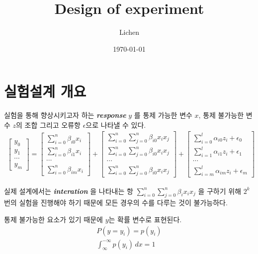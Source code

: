 \documentclass{article}
\author{Lichen}
\date{\today}
\title{Design of experiment}
\newcommand{\imp}[1]{\textbf{\textit{#1}}}
\begin{document}
\begin{titlepage}
    \maketitle
\end{titlepage}
    \section{실험설계 개요}
    실험을 통해 향상시키고자 하는 \imp{response} $y$ 를 통제 가능한 변수 $x$, 통제 불가능한 변수 $z$의 조합 그리고 오류항 $\epsilon$으로 나타낼 수 있다.
    \begin{align}
        \begin{bmatrix}
            y_0 \\ y_1 \\ \cdots \\ y_m
        \end{bmatrix} =
        \begin{bmatrix}
             \sum^n_{i=0}\beta_{i0} x_i\\
             \sum^n_{i=0}\beta_{i1} x_i\\
             \cdots\\
             \sum^n_{i=0}\beta_{im} x_i
        \end{bmatrix} 
        +\begin{bmatrix}
            \sum^n_{i=0}\sum^n_{j=0}\beta_{i0} x_i x_j\\
            \sum^n_{i=0}\sum^n_{j=0}\beta_{i0} x_i x_j\\
            \cdots\\
            \sum^n_{i=0}\sum^n_{j=0}\beta_{i0} x_i x_j
        \end{bmatrix}
        +\begin{bmatrix}
            \sum^l_{i=0}\alpha_{i0} z_i+\epsilon_0\\
            \sum^l_{i=1}\alpha_{i1} z_i+\epsilon_1\\
            \cdots\\
            \sum^l_{i=m}\alpha_{im} z_i+\epsilon_m
        \end{bmatrix}
    \end{align}
    
    실제 설계에서는 \imp{interation} 을 나타내는 항 $\sum^n_{i=0}\sum^n_{j=0}\beta_{i} x_i x_j$ 을 구하기 위해 $2^k$ 번의 실험을 진행해야 하기 때문에 모든 경우의 수를 다루는 것이 불가능하다. 

    통제 불가능한 요소가 있기 때문에 $y$는 확률 변수로 표현된다. 
    \begin{align}
        P(y=y_i) = p(y_i)\\
        \int_{\infty}^{-\infty} p(y_i) \,dx = 1
    \end{align}
    
\end{document}
